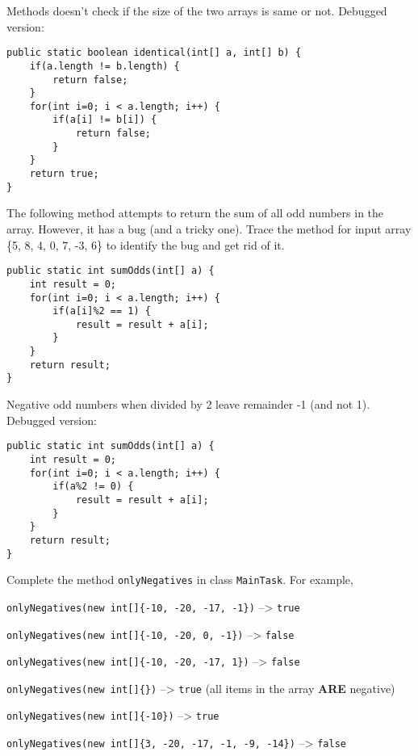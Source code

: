 \begin{questions}
\begin{solution}
Methods doesn't check if the size of the two arrays is same or not. Debugged version:
\begin{lstlisting}
public static boolean identical(int[] a, int[] b) {
	if(a.length != b.length) {
		return false;
	}
	for(int i=0; i < a.length; i++) {
		if(a[i] != b[i]) {
			return false;
		}
	}
	return true;
}	
\end{lstlisting}	
\end{solution}

\vskip 0.5cm

\question The following method attempts to return the sum of all odd numbers in the array. However, it has a bug (and a tricky one). Trace the method for input array \{5, 8, 4, 0, 7, -3, 6\} to identify the bug and get rid of it.

\begin{lstlisting}
public static int sumOdds(int[] a) {
	int result = 0;
	for(int i=0; i < a.length; i++) {
		if(a[i]%2 == 1) {
			result = result + a[i];
		}
	}
	return result;
}
\end{lstlisting}

\begin{solution}
Negative odd numbers when divided by 2 leave remainder -1 (and not 1). Debugged version:
\begin{lstlisting}
public static int sumOdds(int[] a) {
	int result = 0;
	for(int i=0; i < a.length; i++) {
		if(a%2 != 0) {
			result = result + a[i];
		}
	}
	return result;
}	
\end{lstlisting}	
\end{solution}

\vskip 0.5cm

\question Complete the method \texttt{onlyNegatives} in class \texttt{MainTask}. For example,

\texttt{onlyNegatives(new int[]\{-10, -20, -17, -1\})} --> \texttt{true}

\texttt{onlyNegatives(new int[]\{-10, -20, 0, -1\})} --> \texttt{false}

\texttt{onlyNegatives(new int[]\{-10, -20, -17, 1\})} --> \texttt{false}

\texttt{onlyNegatives(new int[]\{\})} --> \texttt{true} (all items in the array \textbf{ARE} negative)

\texttt{onlyNegatives(new int[]\{-10\})} --> \texttt{true}

\texttt{onlyNegatives(new int[]\{3, -20, -17, -1, -9, -14\})} --> \texttt{false}


\end{questions}
